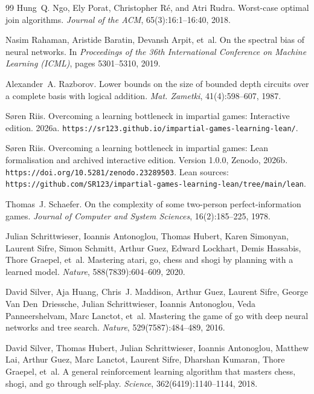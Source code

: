 \documentclass[11pt]{article}
\theoremstyle{plain}
\theoremstyle{definition}
\theoremstyle{remark}
\numberwithin{equation}{section}
\begin{document}
\begin{thebibliography}{99}
Hung~Q. Ngo, Ely Porat, Christopher R{\'e}, and Atri Rudra.
\newblock Worst-case optimal join algorithms.
\newblock \emph{Journal of the ACM}, 65(3):16:1--16:40, 2018.

Nasim Rahaman, Aristide Baratin, Devansh Arpit, et~al.
\newblock On the spectral bias of neural networks.
\newblock In \emph{Proceedings of the 36th International Conference on Machine Learning (ICML)}, pages 5301--5310, 2019.

Alexander~A. Razborov.
\newblock Lower bounds on the size of bounded depth circuits over a complete basis with logical addition.
\newblock \emph{Mat. Zametki}, 41(4):598--607, 1987.

S{\o}ren Riis.
\newblock Overcoming a learning bottleneck in impartial games: Interactive edition.
\newblock 2026a.
\newblock \nolinkurl{https://sr123.github.io/impartial-games-learning-lean/}.

S{\o}ren Riis.
\newblock Overcoming a learning bottleneck in impartial games: Lean formalisation and archived interactive edition.
\newblock Version 1.0.0, Zenodo, 2026b.
\newblock \nolinkurl{https://doi.org/10.5281/zenodo.23289503}.
\newblock Lean sources: \nolinkurl{https://github.com/SR123/impartial-games-learning-lean/tree/main/lean}.

Thomas~J. Schaefer.
\newblock On the complexity of some two-person perfect-information games.
\newblock \emph{Journal of Computer and System Sciences}, 16(2):185--225, 1978.

Julian Schrittwieser, Ioannis Antonoglou, Thomas Hubert, Karen Simonyan,
Laurent Sifre, Simon Schmitt, Arthur Guez, Edward Lockhart, Demis Hassabis,
Thore Graepel, et~al.
\newblock Mastering atari, go, chess and shogi by planning with a learned model.
\newblock \emph{Nature}, 588(7839):604--609, 2020.

David Silver, Aja Huang, Chris~J. Maddison, Arthur Guez, Laurent Sifre,
George Van Den~Driessche, Julian Schrittwieser, Ioannis Antonoglou,
Veda Panneershelvam, Marc Lanctot, et~al.
\newblock Mastering the game of go with deep neural networks and tree search.
\newblock \emph{Nature}, 529(7587):484--489, 2016.

David Silver, Thomas Hubert, Julian Schrittwieser, Ioannis Antonoglou,
Matthew Lai, Arthur Guez, Marc Lanctot, Laurent Sifre, Dharshan Kumaran,
Thore Graepel, et~al.
\newblock A general reinforcement learning algorithm that masters chess, shogi, and go through self-play.
\newblock \emph{Science}, 362(6419):1140--1144, 2018.


\end{thebibliography}
\end{document}
